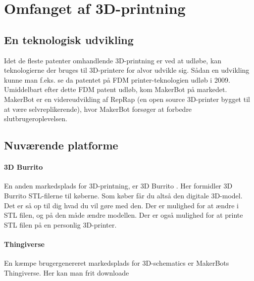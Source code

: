 \section{Omfanget af 3D-printning} %

\subsection{En teknologisk udvikling} %

Idet de fleste patenter omhandlende 3D-printning er ved at udløbe, kan teknologierne der bruges til 3D-printere for alvor udvikle sig. Sådan en udvikling kunne man f.eks. se da patentet på FDM printer-teknologien udløb i 2009. \autocite{manyika_disruptive_2013} Umiddelbart efter dette FDM patent udløb, kom MakerBot på markedet. MakerBot er en videreudvikling af RepRap (en open source 3D-printer bygget til at være selvreplikerende), hvor MakerBot forsøger at forbedre slutbrugeroplevelsen. \autocite{_makerbot_2013}


\subsection{Nuværende platforme} %


\paragraph{3D Burrito} %
\label{par:3d_burrito}

En anden markedsplads for 3D-printning, er 3D Burrito \autocite{_3d_2013-1}. Her formidler 3D Burrito STL-filerne til køberne. Som køber får du altså den digitale 3D-model. Det er så op til dig hvad du vil gøre med den. Der er mulighed for at ændre i STL filen, og på den måde ændre modellen. Der er også mulighed for at printe STL filen på en personlig 3D-printer.


\paragraph{Thingiverse} %
\label{par:thingiverse}

En kæmpe brugergenereret markedsplads for 3D-schematics er MakerBots Thingiverse. Her kan man frit downloade 


